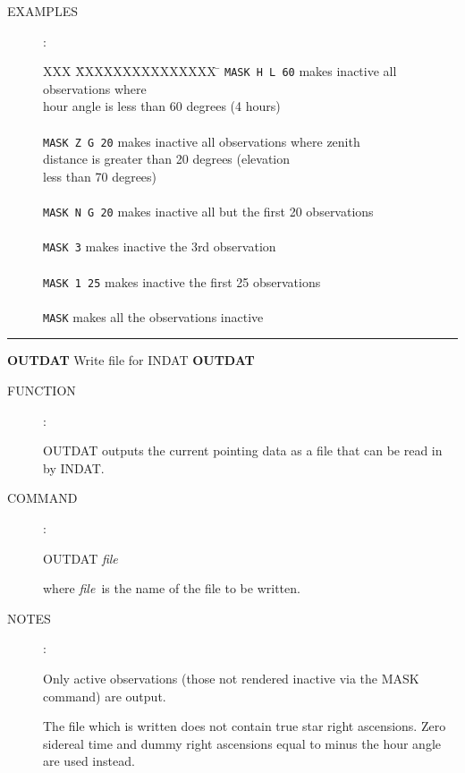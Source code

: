 \begin{description}
\item [EXAMPLES]:
\begin{tabbing}
XXX \= XXXXXXXXXXXXXXX \= \kill
\> {\tt MASK H L 60} \> makes inactive all observations where \\
\>                   \> hour angle is less than 60 degrees (4 hours) \\ \\
\> {\tt MASK Z G 20} \> makes inactive all observations where zenith \\
\>                   \> distance is greater than 20 degrees (elevation \\
\>                   \> less than 70 degrees) \\ \\
\> {\tt MASK N G 20} \> makes inactive all but the first 20 observations \\ \\
\> {\tt MASK 3}      \> makes inactive the 3rd observation \\ \\
\> {\tt MASK 1 25}   \> makes inactive the first 25 observations \\ \\
\> {\tt MASK}        \> makes all the observations inactive
\end{tabbing}

\end{description}


\goodbreak
\rule{\textwidth}{0.3mm}
{\Large {\bf OUTDAT} \hfill Write file for INDAT \hfill {\bf OUTDAT}}
\begin{description}
\item [FUNCTION]:

OUTDAT outputs the current pointing data as a file
that can be read in by INDAT.

\item [COMMAND]:

\begin{cmd}
\> \> OUTDAT {\it file}
\end{cmd}

where {\it file}\, is the name of the file to be written.

\item [NOTES]:

Only active observations (those
not rendered inactive via the MASK command) are output.

The file which is written does not contain true star right
ascensions.  Zero sidereal time and dummy right ascensions
equal to minus the hour angle are used instead.

\end{description}

